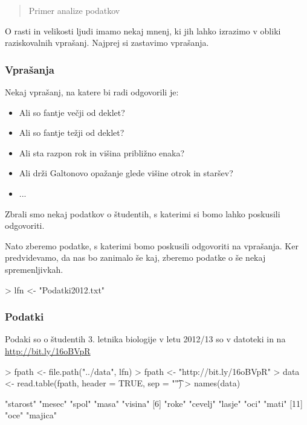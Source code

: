  {\maketitle}
 {\frame{\titlepage}}
\tableofcontents
\begin{abstract}
 Primer analize podatkov
\end{abstract}
O rasti in velikosti ljudi imamo nekaj mnenj, ki jih lahko izrazimo v obliki raziskovalnih vprašanj. Najprej si zastavimo vprašanja.
\begin{frame}[fragile]
\frametitle{Vprašanja}
Nekaj vprašanj, na katere bi radi odgovorili je:
\begin{itemize}
  \item Ali so fantje večji od deklet?
  \item Ali so fantje težji od deklet?
  \item Ali sta razpon rok in višina približno enaka?
  \item Ali drži Galtonovo opažanje glede višine otrok in staršev?
  \item ...
\end{itemize}
Zbrali smo nekaj podatkov o študentih, s katerimi si bomo lahko poskusili odgovoriti.
\end{frame}
Nato zberemo podatke, s katerimi bomo poskusili odgovoriti na vprašanja. Ker predvidevamo, da nas bo zanimalo še kaj, zberemo podatke o še nekaj spremenljivkah.
\begin{Schunk}
\begin{Sinput}
> lfn <- "Podatki2012.txt"
\end{Sinput}
\end{Schunk}

\begin{frame}[fragile]
\frametitle{Podatki}
Podaki so o študentih 3. letnika biologije v letu 2012/13 so v datoteki  in na \url{http://bit.ly/16oBVpR}
\begin{Schunk}
\begin{Sinput}
> fpath <- file.path("../data", lfn)
> fpath <- "http://bit.ly/16oBVpR"
> data <- read.table(fpath, header = TRUE, sep = "\t")
> names(data)
\end{Sinput}
\begin{Soutput}
 [1] "starost" "mesec"   "spol"    "masa"    "visina" 
 [6] "roke"    "cevelj"  "lasje"   "oci"     "mati"   
[11] "oce"     "majica" 
\end{Soutput}
\end{Schunk}
\end{frame}


